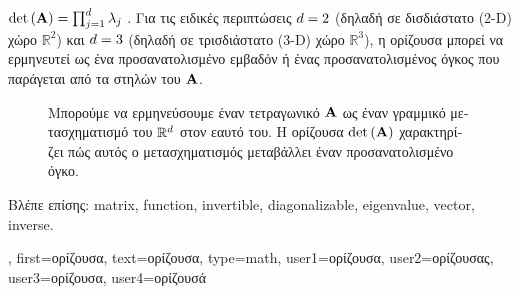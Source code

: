 {{		$\det\,({\bf A}) = \prod_{j=1}^{d} \lambda_{j}$ \cite{HornMatAnalysis}. \foreignlanguage{greek}{Για τις ειδικές 
		περιπτώσεις $d=2$ (δηλαδή σε δισδιάστατο} (2-D) \foreignlanguage{greek}{χώρο $\mathbb{R}^{2}$) και $d=3$ (δηλαδή σε 
		τρισδιάστατο} (3-D) \foreignlanguage{greek}{χώρο $\mathbb{R}^{3}$), η ορίζουσα μπορεί να ερμηνευτεί ως ένα προσανατολισμένο εμβαδόν
		ή ένας προσανατολισμένος όγκος που παράγεται από τα}  \foreignlanguage{greek}{στηλών του} ${\bf A}$.
    		\begin{figure}[H]
    			\begin{center}
			\end{center}
			{
		\caption{\foreignlanguage{greek}{Μπορούμε να ερμηνεύσουμε έναν τετραγωνικό}  ${\bf A}$ 
			\foreignlanguage{greek}{ως έναν γραμμικό μετασχηματισμό του $\mathbb{R}^{d}$ στον εαυτό του.
			Η ορίζουσα $\det\,({\bf A})$ χαρακτηρίζει πώς αυτός ο μετασχηματισμός μεταβάλλει έναν προσανατολισμένο όγκο.}
			\label{fig_det_dict}} }
		\end{figure}
		\foreignlanguage{greek}{Βλέπε επίσης:} \gls{matrix}, \gls{function}, \gls{invertible}, \gls{diagonalizable}, \gls{eigenvalue}, \gls{vector}, \gls{inverse}.},
	first={\foreignlanguage{greek}{ορίζουσα}},
	text={\foreignlanguage{greek}{ορίζουσα}},
	type=math,
	user1={\foreignlanguage{greek}{ορίζουσα}}, %
	user2={\foreignlanguage{greek}{ορίζουσας}}, %
	user3={\foreignlanguage{greek}{ορίζουσα}}, %
	user4={\foreignlanguage{greek}{ορίζουσά}} %
}

